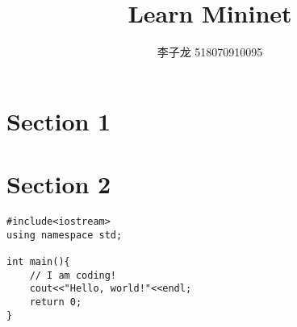 \documentclass[UTF8]{ctexart}
\author{李子龙 518070910095}
\begin{document}
    \title{Learn Mininet}
    \maketitle
    \tableofcontents
    \section{Section 1}
    \lipsum[1]
    \section{Section 2}
    \zhlipsum[1]
    \begin{lstlisting}[caption=test.cpp]
#include<iostream>
using namespace std;

int main(){
    // I am coding!
    cout<<"Hello, world!"<<endl;
    return 0;
}
\end{lstlisting}
\end{document}
